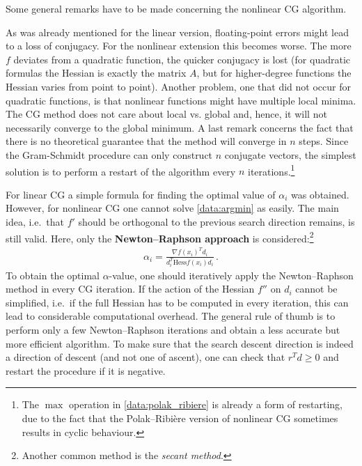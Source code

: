     Some general remarks have to be made concerning the nonlinear CG algorithm.
    \begin{remark}
        As was already mentioned for the linear version, floating-point errors might lead to a loss of conjugacy. For the nonlinear extension this becomes worse. The more $f$ deviates from a quadratic function, the quicker conjugacy is lost (for quadratic formulas the Hessian is exactly the matrix $A$, but for higher-degree functions the Hessian varies from point to point). Another problem, one that did not occur for quadratic functions, is that nonlinear functions might have multiple local minima. The CG method does not care about local vs. global and, hence, it will not necessarily converge to the global minimum. A last remark concerns the fact that there is no theoretical guarantee that the method will converge in $n$ steps. Since the Gram-Schmidt procedure can only construct $n$ conjugate vectors, the simplest solution is to perform a restart of the algorithm every $n$ iterations.\footnote{The $\max$ operation in \cref{data:polak_ribiere} is already a form of restarting, due to the fact that the Polak--Ribi\`ere version of nonlinear CG sometimes results in cyclic behaviour.}
    \end{remark}

    For linear CG a simple formula for finding the optimal value of $\alpha_i$ was obtained. However, for nonlinear CG one cannot solve \cref{data:argmin} as easily. The main idea, i.e.~that $f'$ should be orthogonal to the previous search direction remains, is still valid. Here, only the \textbf{Newton--Raphson approach} is considered:\footnote{Another common method is the \textit{secant method}.}
    \begin{gather}
        \alpha_i = \frac{\nabla f(x_i)^Td_i}{d_i^T\mathrm{Hess}f(x_i)d_i}\,.
    \end{gather}
    To obtain the optimal $\alpha$-value, one should iteratively apply the Newton--Raphson method in every CG iteration. If the action of the Hessian $f''$ on $d_i$ cannot be simplified, i.e.~if the full Hessian has to be computed in every iteration, this can lead to considerable computational overhead. The general rule of thumb is to perform only a few Newton--Raphson iterations and obtain a less accurate but more efficient algorithm. To make sure that the search descent direction is indeed a direction of descent (and not one of ascent), one can check that $r^Td\geq0$ and restart the procedure if it is negative.

